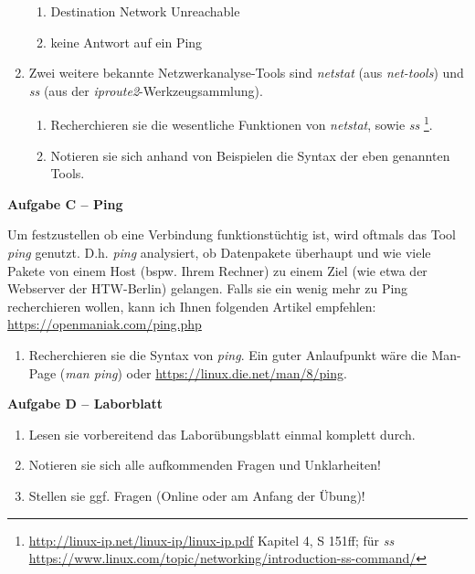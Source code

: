 \documentclass[paper=a4,fontsize=11pt]{scrartcl}%
\numberwithin{equation}{section}
\begin{document}
\begin{enumerate}
\begin{enumerate}
		\item Destination Network Unreachable
		\item keine Antwort auf ein Ping
	\end{enumerate}
	\item Zwei weitere bekannte Netzwerkanalyse-Tools sind \emph{netstat} (aus \emph{net-tools}) und \emph{ss} (aus der \emph{iproute2}-Werkzeugsammlung).
	\begin{enumerate}
		\item Recherchieren sie die wesentliche Funktionen von \emph{netstat}, sowie \emph{ss} \footnote{\url{http://linux-ip.net/linux-ip/linux-ip.pdf} Kapitel 4, S 151ff; für \emph{ss} \url{https://www.linux.com/topic/networking/introduction-ss-command/}}.
		\item Notieren sie sich anhand von Beispielen die Syntax der eben genannten Tools. 
	\end{enumerate}
\end{enumerate}

\begin{center}\Large{\textbf{Aufgabe C -- Ping}}\end{center}
Um festzustellen ob eine Verbindung funktionstüchtig ist, wird oftmals das Tool \emph{ping} genutzt. D.h. \emph{ping} analysiert, ob Datenpakete überhaupt und wie viele Pakete von einem Host (bspw. Ihrem Rechner) zu einem Ziel (wie etwa der Webserver der HTW-Berlin) gelangen. Falls sie ein wenig mehr zu Ping recherchieren wollen, kann ich Ihnen folgenden Artikel empfehlen: \url{https://openmaniak.com/ping.php}
\begin{enumerate}
	\item Recherchieren sie die Syntax von \emph{ping}. Ein guter Anlaufpunkt wäre die Man-Page (\emph{man ping}) oder \url{https://linux.die.net/man/8/ping}.
\end{enumerate}
\begin{center}\Large{\textbf{Aufgabe D -- Laborblatt}}\end{center}
\begin{enumerate}
	\item Lesen sie vorbereitend das Laborübungsblatt einmal komplett durch.
	\item Notieren sie sich alle aufkommenden Fragen und Unklarheiten!
	\item Stellen sie ggf. Fragen (Online oder am Anfang der Übung)! 
\end{enumerate}


\end{document}
